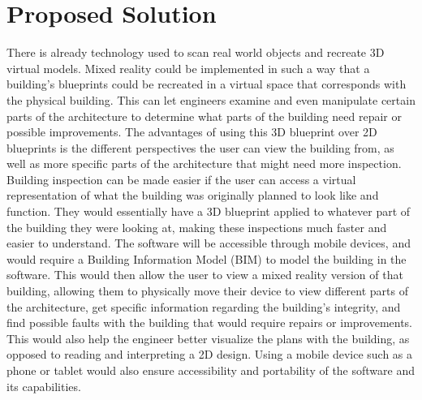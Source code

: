 \documentclass[onecolumn, draftclsnofoot,10pt, compsoc]{IEEEtran}
\begin{document}
\section{Proposed Solution}
There is already technology used to scan real world objects and recreate 3D virtual models. Mixed reality could be implemented in such a way that a building’s blueprints could be recreated in a virtual space that corresponds with the physical building. This can let engineers examine and even manipulate certain parts of the architecture to determine what parts of the building need repair or possible improvements. The advantages of using this 3D blueprint over 2D blueprints is the different perspectives the user can view the building from, as well as more specific parts of the architecture that might need more inspection. \newline
Building inspection can be made easier if the user can access a virtual representation of what the building was originally planned to look like and function. They would essentially have a 3D blueprint applied to whatever part of the building they were looking at, making these inspections much faster and easier to understand. The software will be accessible through mobile devices, and would require a Building Information Model (BIM) to model the building in the software. This would then allow the user to view a mixed reality version of that building, allowing them to physically move their device to view different parts of the architecture, get specific information regarding the building's integrity, and find possible faults with the building that would require repairs or improvements. This would also help the engineer better visualize the plans with the building, as opposed to reading and interpreting a 2D design. Using a mobile device such as a phone or tablet would also ensure accessibility and portability of the software and its capabilities. 
\end{document}

